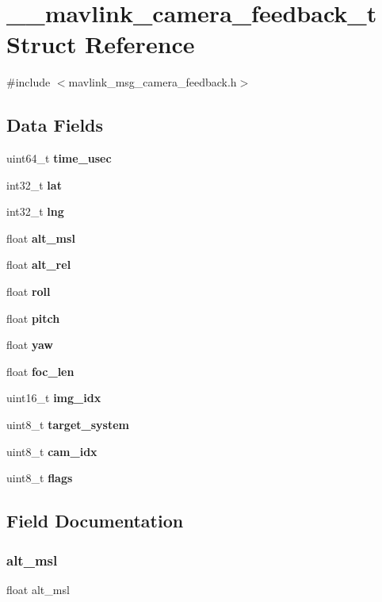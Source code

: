 \section{\+\_\+\+\_\+mavlink\+\_\+camera\+\_\+feedback\+\_\+t Struct Reference}
\label{struct____mavlink__camera__feedback__t}


{\ttfamily \#include $<$mavlink\+\_\+msg\+\_\+camera\+\_\+feedback.\+h$>$}

\subsection*{Data Fields}
\begin{DoxyCompactItemize}
\item 
uint64\+\_\+t \textbf{ time\+\_\+usec}
\item 
int32\+\_\+t \textbf{ lat}
\item 
int32\+\_\+t \textbf{ lng}
\item 
float \textbf{ alt\+\_\+msl}
\item 
float \textbf{ alt\+\_\+rel}
\item 
float \textbf{ roll}
\item 
float \textbf{ pitch}
\item 
float \textbf{ yaw}
\item 
float \textbf{ foc\+\_\+len}
\item 
uint16\+\_\+t \textbf{ img\+\_\+idx}
\item 
uint8\+\_\+t \textbf{ target\+\_\+system}
\item 
uint8\+\_\+t \textbf{ cam\+\_\+idx}
\item 
uint8\+\_\+t \textbf{ flags}
\end{DoxyCompactItemize}


\subsection{Field Documentation}
\mbox{\label{struct____mavlink__camera__feedback__t_af319d891e267b105f40414ea4531e847}} 
\subsubsection{alt\+\_\+msl}
{\footnotesize\ttfamily float alt\+\_\+msl}

